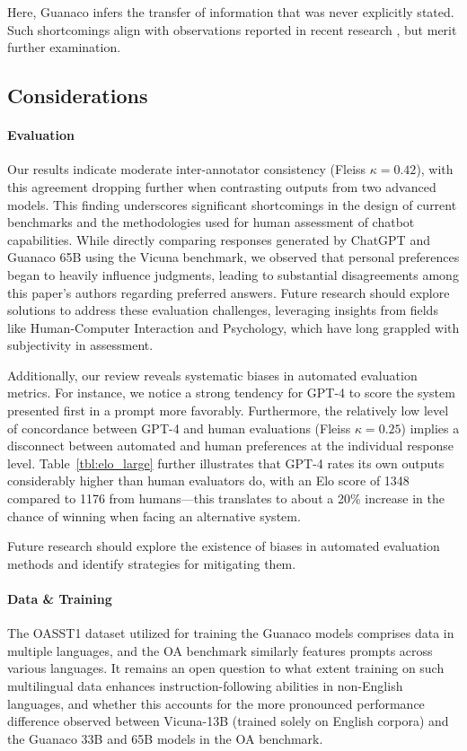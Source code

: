 Here, {Guanaco} infers the transfer of information that was never explicitly stated. Such shortcomings align with observations reported in recent research \cite{sap2022neural}, but merit further examination.

\subsection{Considerations}
\label{ssec:considerations}

\paragraph{Evaluation}

Our results indicate moderate inter-annotator consistency (Fleiss $\kappa=0.42$), with this agreement dropping further when contrasting outputs from two advanced models. This finding underscores significant shortcomings in the design of current benchmarks and the methodologies used for human assessment of chatbot capabilities. While directly comparing responses generated by ChatGPT and {Guanaco} 65B using the Vicuna benchmark, we observed that personal preferences began to heavily influence judgments, leading to substantial disagreements among this paper’s authors regarding preferred answers. Future research should explore solutions to address these evaluation challenges, leveraging insights from fields like Human-Computer Interaction and Psychology, which have long grappled with subjectivity in assessment.

Additionally, our review reveals systematic biases in automated evaluation metrics. For instance, we notice a strong tendency for GPT-4 to score the system presented first in a prompt more favorably. Furthermore, the relatively low level of concordance between GPT-4 and human evaluations (Fleiss $\kappa=0.25$) implies a disconnect between automated and human preferences at the individual response level. Table~\ref{tbl:elo_large} further illustrates that GPT-4 rates its own outputs considerably higher than human evaluators do, with an Elo score of 1348 compared to 1176 from humans—this translates to about a 20\% increase in the chance of winning when facing an alternative system.

Future research should explore the existence of biases in automated evaluation methods and identify strategies for mitigating them.

\paragraph{Data \& Training} The OASST1 dataset utilized for training the {Guanaco} models comprises data in multiple languages, and the OA benchmark similarly features prompts across various languages. It remains an open question to what extent training on such multilingual data enhances instruction-following abilities in non-English languages, and whether this accounts for the more pronounced performance difference observed between Vicuna-13B (trained solely on English corpora) and the {Guanaco} 33B and 65B models in the OA benchmark.


